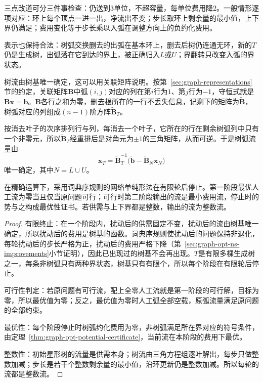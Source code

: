 三点改道可分三件事检查：仍送到$3$单位，不超容量，每单位费用降$2$。一般情形逐项对应：环上每个顶点一进一出，净流出不变；步长取环上剩余量的最小值，上下界仍满足；费用变化等于步长乘以入弧在调整方向上的负约化费用。

表示也保持合法：树弧交换删去的出弧在基本环上，删去后树仍连通无环，新的$T$仍是生成树，出弧落在它到达的界上，被正确归入$L$或$U$；界翻转只改变入弧的界状态。

树流由树基唯一确定，这可以用关联矩阵说明。按第~\ref{sec:graph-representations}节的约定，关联矩阵$\bm B$中弧$(i,j)$对应的列在第$i$行为$1$、第$j$行为$-1$，守恒式就是$\bm B\bm x=\bm b$。$\bm B$各行之和为零，删去根所在的一行不丢失信息，记剩下的矩阵为$\tilde{\bm B}$，树弧对应的列组成$(n-1)$阶方阵$\tilde{\bm B}_T$。

按消去叶子的次序排列行与列，每消去一个叶子，它所在的行在剩余树弧列中只有一个非零元，所以$\tilde{\bm B}_T$经重排后是对角元为$\pm1$的三角矩阵，从而可逆。于是树弧流量由
\begin{equation}
  \bm x_T=\tilde{\bm B}_T^{-1}\bigl(\tilde{\bm b}-\tilde{\bm B}_N\bm x_N\bigr)
  \label{eq:graph-opt-ns-tree-flow}
\end{equation}
唯一确定，其中$N=L\cup U$。

\begin{theorem}[网络单纯形法的正确性]
\label{thm:graph-opt-network-simplex}
在精确运算下，采用词典序规则的网络单纯形法在有限轮后停止。第一阶段最优人工流为零当且仅当原问题可行；可行时第二阶段输出的流是最小费用流，停止时的势与之构成最优性证书。若供需与上下界都是整数，输出的流为整数流。
\end{theorem}

\begin{proof}
有限终止：在一个阶段内，扰动后的供需固定不变，扰动后的流由树基唯一确定，所以扰动后的费用是树基的函数。词典序规则使扰动后的问题保持非退化，每轮扰动后的步长严格为正，扰动后的费用严格下降（第~\ref{sec:graph-opt-ns-improvements}小节证明），因此已出现过的树基不会再出现。$T$是有限多棵生成树之一，每条非树弧只有两种界状态，树基只有有限个，所以每个阶段在有限轮后停止。

可行性判定：若原问题有可行流，配上全零人工流就是第一阶段的可行解，目标为零，所以最优值为零；反之，最优值为零时人工弧全部空载，原弧流量满足原问题的全部约束。

最优性：每个阶段停止时树弧约化费用为零，非树弧满足所在界对应的符号条件，由定理~\ref{thm:graph-opt-potential-certificate}，当前流在本阶段的费用下最优。

整数性：初始星形树的流量是供需本身；树流由三角方程组逐叶解出，每步只做整数加减；步长是若干个整数剩余量的最小值，沿环更新仍是整数加减。所以每轮的流都是整数流。
\end{proof}

